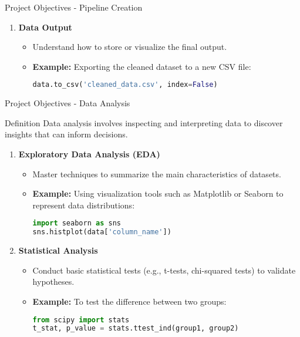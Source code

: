 \documentclass[aspectratio=169]{beamer}
\begin{document}
\begin{frame}[fragile]{Project Objectives - Pipeline Creation}
\begin{enumerate}
        \item \textbf{Data Output}
        \begin{itemize}
            \item Understand how to store or visualize the final output.
            \item \textbf{Example:} Exporting the cleaned dataset to a new CSV file:
            \begin{lstlisting}[language=Python]
data.to_csv('cleaned_data.csv', index=False)
            \end{lstlisting}
        \end{itemize}
    \end{enumerate}
\end{frame}

\begin{frame}[fragile]{Project Objectives - Data Analysis}
    \begin{block}{Definition} 
        Data analysis involves inspecting and interpreting data to discover insights that can inform decisions.
    \end{block}

    \begin{enumerate}
        \item \textbf{Exploratory Data Analysis (EDA)}
        \begin{itemize}
            \item Master techniques to summarize the main characteristics of datasets.
            \item \textbf{Example:} Using visualization tools such as Matplotlib or Seaborn to represent data distributions:
            \begin{lstlisting}[language=Python]
import seaborn as sns
sns.histplot(data['column_name'])
            \end{lstlisting}
        \end{itemize}

        \item \textbf{Statistical Analysis}
        \begin{itemize}
            \item Conduct basic statistical tests (e.g., t-tests, chi-squared tests) to validate hypotheses.
            \item \textbf{Example:} To test the difference between two groups:
            \begin{lstlisting}[language=Python]
from scipy import stats
t_stat, p_value = stats.ttest_ind(group1, group2)
            \end{lstlisting}
        \end{itemize}


\end{enumerate}
\end{frame}
\end{document}
